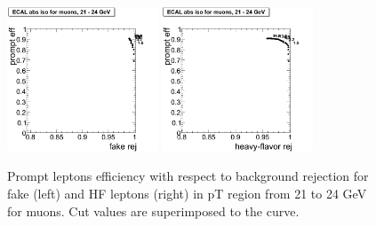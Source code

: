 \begin{figure}[htbp]
\begin{center}

 \includegraphics[width = 0.4\textwidth]{pictures/trackCut/bkgdRej_sigEff/muon_fake_ptCut6_ptCut7.png}
\includegraphics[width = 0.4\textwidth]{pictures/trackCut/bkgdRej_sigEff/muon_nonPrompt_ptCut6_ptCut7.png}
\caption{\small{Prompt leptons efficiency with respect to background 
rejection for fake (left) and HF leptons (right) in pT region
from 21 to 24 GeV for muons. 
Cut values are superimposed to the curve.}\label{fig:ecalrej_mu7}}
\end{center}
\end{figure}

